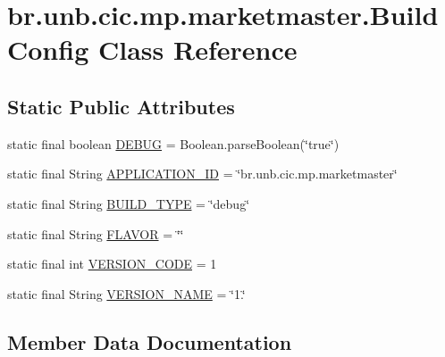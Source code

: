 \hypertarget{classbr_1_1unb_1_1cic_1_1mp_1_1marketmaster_1_1BuildConfig}{}\section{br.\+unb.\+cic.\+mp.\+marketmaster.\+Build\+Config Class Reference}
\label{classbr_1_1unb_1_1cic_1_1mp_1_1marketmaster_1_1BuildConfig}
\subsection*{Static Public Attributes}
\begin{DoxyCompactItemize}
\item 
static final boolean \mbox{\hyperlink{classbr_1_1unb_1_1cic_1_1mp_1_1marketmaster_1_1BuildConfig_a489c29766fd24616cdbc79fee6e3ba50}{D\+E\+B\+UG}} = Boolean.\+parse\+Boolean(\char`\"{}true\char`\"{})
\item 
static final String \mbox{\hyperlink{classbr_1_1unb_1_1cic_1_1mp_1_1marketmaster_1_1BuildConfig_aa2b7273327da68b8407858844df2ecb7}{A\+P\+P\+L\+I\+C\+A\+T\+I\+O\+N\+\_\+\+ID}} = \char`\"{}br.\+unb.\+cic.\+mp.\+marketmaster\char`\"{}
\item 
static final String \mbox{\hyperlink{classbr_1_1unb_1_1cic_1_1mp_1_1marketmaster_1_1BuildConfig_a32819d8f54a57044cfdc480de23badc9}{B\+U\+I\+L\+D\+\_\+\+T\+Y\+PE}} = \char`\"{}debug\char`\"{}
\item 
static final String \mbox{\hyperlink{classbr_1_1unb_1_1cic_1_1mp_1_1marketmaster_1_1BuildConfig_af53eb1d271ad21d4a779ef7ee7069320}{F\+L\+A\+V\+OR}} = \char`\"{}\char`\"{}
\item 
static final int \mbox{\hyperlink{classbr_1_1unb_1_1cic_1_1mp_1_1marketmaster_1_1BuildConfig_a465709c2b0d665e0690813ec5e5859e5}{V\+E\+R\+S\+I\+O\+N\+\_\+\+C\+O\+DE}} = 1
\item 
static final String \mbox{\hyperlink{classbr_1_1unb_1_1cic_1_1mp_1_1marketmaster_1_1BuildConfig_a1faf9caad9204408ab124fc4ffc39870}{V\+E\+R\+S\+I\+O\+N\+\_\+\+N\+A\+ME}} = \char`\"{}1.\char`\"{}
\end{DoxyCompactItemize}


\subsection{Member Data Documentation}
\mbox{\label{classbr_1_1unb_1_1cic_1_1mp_1_1marketmaster_1_1BuildConfig_aa2b7273327da68b8407858844df2ecb7}} 
